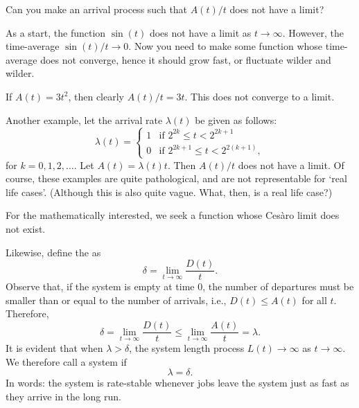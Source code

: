 \begin{extra}
  Can you make an arrival process such that $A(t)/t$ does not have a limit?
\begin{hint}
  As a start, the function $\sin(t)$ does not have a limit as $t\to\infty$.
  However, the time-average $\sin(t)/t \to 0$.
  Now you need to make some function whose time-average does not converge, hence it should grow fast, or fluctuate wilder and wilder.
\end{hint}
\begin{solution}
 If $A(t) = 3 t^2$, then clearly $A(t)/t = 3t$. This does not
 converge to a limit. 

 Another example, let the arrival rate $\lambda(t)$ be given as follows:
 \begin{equation*}
 \lambda(t) = 
 \begin{cases}
 1 & \text{if } 2^{2k} \leq t < 2^{2k+1} \\
 0 & \text{if } 2^{2k+1} \leq t < 2^{2(k+1)},
 \end{cases}
 \end{equation*}
 for $k=0,1,2,\ldots$.
 Let $A(t) = \lambda(t) t$.
 Then $A(t)/t$ does not have a limit.
 Of course, these examples are quite pathological, and are not representable for `real life cases'.
 (Although this is also quite vague.
 What, then, is a real life case?)

 For the mathematically interested, we seek a function whose Ces\`aro limit does not exist.
\end{solution}
\end{extra}

Likewise, define the  as
\begin{equation}\label{eq:28}
 \delta = \lim_{t\to\infty} \frac{D(t)}t.
\end{equation}
Observe that, if the system is empty at time $0$, the number of departures must be smaller than or equal to the number of arrivals, i.e., $D(t) \leq A(t)$ for all $t$.
Therefore,
\begin{equation}\label{eq:26}
\delta = \lim_{t\to\infty} \frac{D(t)}t \leq \lim_{t\to\infty} \frac{A(t)}t = \lambda.
\end{equation}
It is evident that when $\lambda > \delta$, the system length process $L(t) \to \infty$ as $t\to \infty$.
We therefore call a system  if
\begin{equation*}
 \lambda = \delta.
\end{equation*}
In  words: the system is rate-stable whenever jobs leave the system just as fast as they arrive in the long run.


